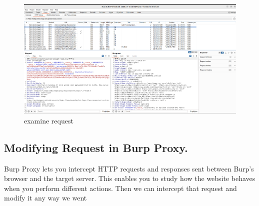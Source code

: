 \documentclass[
	a4paper, %
	12pt, %
]{CSSullivanBusinessReport}
\begin{document}
\begin{figure}[H]
    \centering
    \includegraphics[width=1\textwidth]{Images/anikaScreensots/proxy3.png}
    \caption{examine request}
    \label{fig:enter-label}
\end{figure}
\subsection*{Modifying Request in Burp Proxy.}
\begin{fullwidth}
    Burp Proxy lets you intercept HTTP requests and responses sent between Burp's browser and the target server. This enables you to study how the website behaves when you perform different actions. Then we can intercept that request and modify it any way we went
\end{fullwidth}
\end{document}
